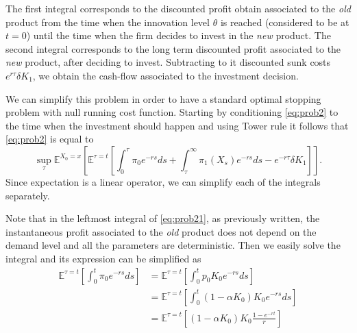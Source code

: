 The first integral corresponds to the discounted profit obtain associated to the \textit{old} product from the time when the innovation level $\theta$ is reached (considered to be at $t=0$) until the time when the firm decides to invest in the \textit{new} product. The second integral corresponds to the long term discounted profit associated to the \textit{new} product, after deciding to invest. Subtracting to it discounted sunk costs $e^{r \tau} \delta K_1$, we obtain the cash-flow associated to the investment decision.

We can simplify this problem in order to have a standard optimal stopping problem with null running cost function.
Starting by conditioning \eqref{eq:prob2} to the time when the investment should happen and using Tower rule it follows that \eqref{eq:prob2} is equal to
\begin{equation}
\sup _\tau \mathds{E}^{X_0=x} \left[ \mathds{E}^{\tau=t} \left[  \int_0^\tau \pi_0e^{-rs} ds +  \int_\tau^\infty \pi_1(X_s)e^{-rs}ds -e^{-r\tau} \delta K_1 \right] \right].
\label{eq:prob21}
\end{equation}
Since expectation is a linear operator, we can simplify each of the integrals separately.

Note that in the leftmost integral of \eqref{eq:prob21}, as previously written, the instantaneous profit associated to the \textit{old} product does not depend on the demand level and all the parameters are deterministic. Then we easily solve the integral and its expression can be simplified as
\begin{align}
\mathds{E}^{\tau=t} \left[\int_0^t \pi_0e^{-rs} ds \right] 
&= \mathds{E}^{\tau=t} \left[ \int_0^t p_0K_0e^{-rs} ds \right] \nonumber \\
&= \mathds{E}^{\tau=t} \left[ \int_0^t (1-\alpha K_0) K_0e^{-rs} ds \right] \nonumber \\
&= \mathds{E}^{\tau=t} \left[ (1-\alpha K_0) K_0 \frac{1-e^{-r t}}{r} \right] 
\label{g2}
\end{align}

